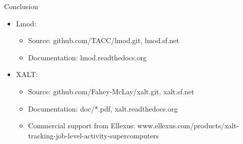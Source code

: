 \documentclass{beamer}
\begin{document}
\begin{frame}{Conclusion}
  \begin{itemize}
    \item Lmod:
      \begin{itemize}
        \item Source: github.com/TACC/lmod.git, lmod.sf.net
        \item Documentation: lmod.readthedocs.org
      \end{itemize}
    \item XALT:
      \begin{itemize}
        \item Source: github.com/Fahey-McLay/xalt.git, xalt.sf.net
        \item Documentation: doc/*.pdf, xalt.readthedocs.org
        \item Commercial support from Ellexus: www.ellexus.com/products/xalt-tracking-job-level-activity-supercomputers
      \end{itemize}
  \end{itemize}
\end{frame}
\end{document}
